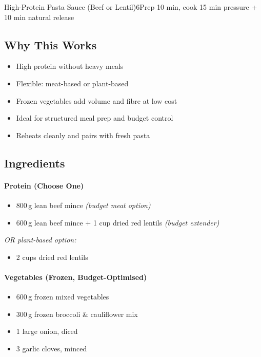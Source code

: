 \begin{recipebox}{High-Protein Pasta Sauce (Beef or Lentil)}{6}{Prep 10 min, cook 15 min pressure + 10 min natural release}
\subsection*{Why This Works}
\begin{itemize}
    \item High protein without heavy meals
    \item Flexible: meat-based or plant-based
    \item Frozen vegetables add volume and fibre at low cost
    \item Ideal for structured meal prep and budget control
    \item Reheats cleanly and pairs with fresh pasta
\end{itemize}

\subsection*{Ingredients}

\paragraph{Protein (Choose One)}
\begin{itemize}
    \item 800\,g lean beef mince \emph{(budget meat option)}
    \item 600\,g lean beef mince + 1 cup dried red lentils \emph{(budget extender)}
\end{itemize}

\textit{OR plant-based option:}

\begin{itemize}
    \item 2 cups dried red lentils
\end{itemize}

\paragraph{Vegetables (Frozen, Budget-Optimised)}
\begin{itemize}
    \item 600\,g frozen mixed vegetables
    \item 300\,g frozen broccoli \& cauliflower mix
    \item 1 large onion, diced
    \item 3 garlic cloves, minced
\end{itemize}


\end{recipebox}
